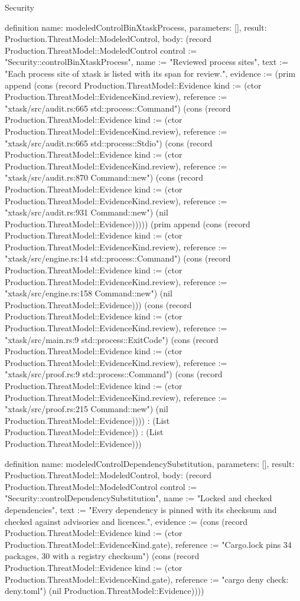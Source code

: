 \begin{lexlean}{Security}
\begin{semanticmodule}
definition{
  name: modeledControlBinXtaskProcess,
  parameters: [],
  result: Production.ThreatModel::ModeledControl,
  body: (record Production.ThreatModel::ModeledControl {control := "Security::controlBinXtaskProcess", name := "Reviewed process sites", text := "Each process site of xtask is listed with its span for review.", evidence := (prim append (cons (record Production.ThreatModel::Evidence {kind := (ctor Production.ThreatModel::EvidenceKind.review), reference := "xtask/src/audit.rs:665 std::process::Command"}) (cons (record Production.ThreatModel::Evidence {kind := (ctor Production.ThreatModel::EvidenceKind.review), reference := "xtask/src/audit.rs:665 std::process::Stdio"}) (cons (record Production.ThreatModel::Evidence {kind := (ctor Production.ThreatModel::EvidenceKind.review), reference := "xtask/src/audit.rs:870 Command::new"}) (cons (record Production.ThreatModel::Evidence {kind := (ctor Production.ThreatModel::EvidenceKind.review), reference := "xtask/src/audit.rs:931 Command::new"}) (nil Production.ThreatModel::Evidence))))) (prim append (cons (record Production.ThreatModel::Evidence {kind := (ctor Production.ThreatModel::EvidenceKind.review), reference := "xtask/src/engine.rs:14 std::process::Command"}) (cons (record Production.ThreatModel::Evidence {kind := (ctor Production.ThreatModel::EvidenceKind.review), reference := "xtask/src/engine.rs:158 Command::new"}) (nil Production.ThreatModel::Evidence))) (cons (record Production.ThreatModel::Evidence {kind := (ctor Production.ThreatModel::EvidenceKind.review), reference := "xtask/src/main.rs:9 std::process::ExitCode"}) (cons (record Production.ThreatModel::Evidence {kind := (ctor Production.ThreatModel::EvidenceKind.review), reference := "xtask/src/proof.rs:9 std::process::Command"}) (cons (record Production.ThreatModel::Evidence {kind := (ctor Production.ThreatModel::EvidenceKind.review), reference := "xtask/src/proof.rs:215 Command::new"}) (nil Production.ThreatModel::Evidence)))) : (List Production.ThreatModel::Evidence)) : (List Production.ThreatModel::Evidence))})
}

definition{
  name: modeledControlDependencySubstitution,
  parameters: [],
  result: Production.ThreatModel::ModeledControl,
  body: (record Production.ThreatModel::ModeledControl {control := "Security::controlDependencySubstitution", name := "Locked and checked dependencies", text := "Every dependency is pinned with its checksum and checked against advisories and licences.", evidence := (cons (record Production.ThreatModel::Evidence {kind := (ctor Production.ThreatModel::EvidenceKind.gate), reference := "Cargo.lock pins 34 packages, 30 with a registry checksum"}) (cons (record Production.ThreatModel::Evidence {kind := (ctor Production.ThreatModel::EvidenceKind.gate), reference := "cargo deny check: deny.toml"}) (nil Production.ThreatModel::Evidence)))})
}


\end{semanticmodule}
\end{lexlean}
